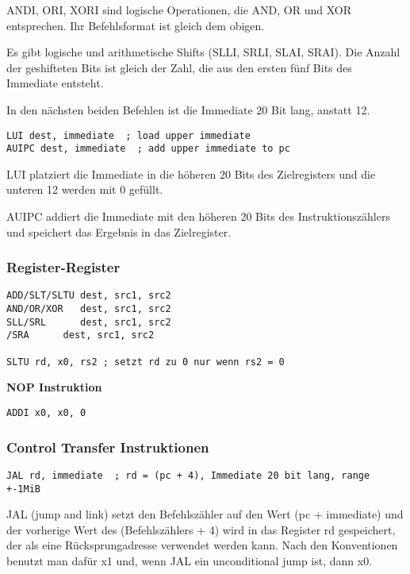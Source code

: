 ANDI, ORI, XORI sind logische Operationen, die AND, OR und XOR entsprechen. Ihr
Befehlsformat ist gleich dem obigen.

Es gibt logische und arithmetische Shifts (SLLI, SRLI, SLAI, SRAI). Die Anzahl
der geshifteten Bits ist gleich der Zahl, die aus den ersten fünf Bits des
Immediate entsteht.

In den nächsten beiden Befehlen ist die Immediate 20 Bit lang, anstatt 12.

\begin{lstlisting}
LUI dest, immediate  ; load upper immediate
AUIPC dest, immediate  ; add upper immediate to pc
\end{lstlisting}

LUI platziert die Immediate in die höheren 20 Bits des Zielregisters und die unteren 12 werden mit 0 gefüllt.

AUIPC addiert die Immediate mit den höheren 20 Bits des Instruktionszählers und speichert das Ergebnis in das Zielregister.

\subsubsection{Register-Register}

\begin{lstlisting}
ADD/SLT/SLTU dest, src1, src2
AND/OR/XOR   dest, src1, src2
SLL/SRL      dest, src1, src2
/SRA      dest, src1, src2

SLTU rd, x0, rs2 ; setzt rd zu 0 nur wenn rs2 = 0
\end{lstlisting}

\textbf{NOP Instruktion}

\begin{lstlisting}
ADDI x0, x0, 0
\end{lstlisting}

\subsubsection{Control Transfer Instruktionen}

\begin{lstlisting}
JAL rd, immediate  ; rd = (pc + 4), Immediate 20 bit lang, range +-1MiB
\end{lstlisting}

JAL (jump and link) setzt den Befehlszähler auf den Wert (pc + immediate) und
der vorherige Wert des (Befehlszählers + 4) wird in das Register rd gespeichert,
der als eine Rücksprungadresse verwendet werden kann. Nach den Konventionen
benutzt man dafür x1 und, wenn JAL ein unconditional jump ist, dann x0.

